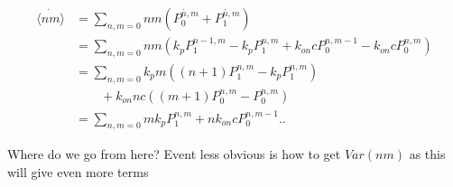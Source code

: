 \begin{equation*}
\begin{aligned}
\dot{ \langle nm \rangle } & = \sum_{n,m=0} nm (\dot{P_0^{n,m}} + \dot{P_1^{n,m}})\\
                          & = \sum_{n,m=0} nm (k_pP_1^{n-1,m} - k_pP_1^{n,m} + k_{on}cP_0^{n,m-1} - k_{on}cP_0^{n,m})\\
                          & = \sum_{n,m=0} k_p m ((n+1)P_1^{n,m} - k_pP_1^{n,m})\\
                          & \qquad + k_{on} nc((m+1)P_0^{n,m} - P_0^{n,m})\\
                          & = \sum_{n,m=0} m k_p P_1^{n,m}  + n k_{on}cP_0^{n,m-1}.
                         .
\end{aligned}
\end{equation*}

Where do we go from here? Event less obvious is how to get $Var(nm)$ as this will give even more terms
